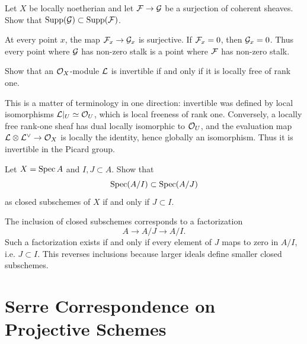 \begin{exercise}\label{ex:support-quotient}
Let \(X\) be locally noetherian and let \(\mathcal{F}\to\mathcal{G}\) be a surjection of
coherent sheaves.  Show that \(\operatorname{Supp}(\mathcal{G})\subset\operatorname{Supp}(\mathcal{F})\).
\end{exercise}

\begin{solution}
At every point \(x\), the map \(\mathcal{F}_x\to\mathcal{G}_x\) is surjective.  If
\(\mathcal{F}_x=0\), then \(\mathcal{G}_x=0\).  Thus every point where \(\mathcal{G}\) has non-zero
stalk is a point where \(\mathcal{F}\) has non-zero stalk.
\end{solution}

\begin{exercise}\label{ex:line-bundle-local}
Show that an \(\mathcal{O}_X\)-module \(\mathcal{L}\) is invertible if and only if it is locally
free of rank one.
\end{exercise}

\begin{solution}
This is a matter of terminology in one direction: invertible was defined by
local isomorphisms \(\mathcal{L}|_U\simeq\mathcal{O}_U\), which is local freeness of rank one.
Conversely, a locally free rank-one sheaf has dual locally isomorphic to
\(\mathcal{O}_U\), and the evaluation map \(\mathcal{L}\otimes\mathcal{L}^\vee\to\mathcal{O}_X\) is locally the
identity, hence globally an isomorphism.  Thus it is invertible in the Picard
group.
\end{solution}

\begin{exercise}\label{ex:ideal-sheaf-affine}
Let \(X=\operatorname{Spec} A\) and \(I,J\subset A\).  Show that
\[
    \operatorname{Spec}(A/I)\subset \operatorname{Spec}(A/J)
\]
as closed subschemes of \(X\) if and only if \(J\subset I\).
\end{exercise}

\begin{solution}
The inclusion of closed subschemes corresponds to a factorization
\[
    A\to A/J\to A/I.
\]
Such a factorization exists if and only if every element of \(J\) maps to zero
in \(A/I\), i.e. \(J\subset I\).  This reverses inclusions because larger ideals
define smaller closed subschemes.
\end{solution}

\section{Serre Correspondence on Projective Schemes}

